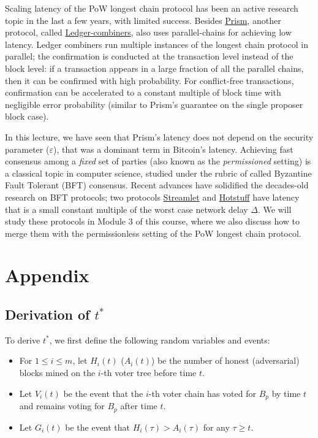 \documentclass{article}
\begin{document}
Scaling latency of the PoW longest chain protocol has been an active research topic in the last a few years,  with limited success. Besides \href{https://arxiv.org/pdf/1810.08092.pdf}{{\sf Prism}}, another protocol, called \href{https://eprint.iacr.org/2020/675.pdf}{Ledger-combiners}, also uses parallel-chains for achieving low latency. Ledger combiners run multiple instances of the longest chain protocol in parallel;  the confirmation is conducted at the transaction level instead of the block level: if a transaction appears in a large fraction of all the parallel chains, then it can be confirmed with high probability. For conflict-free transactions, confirmation can be accelerated to a constant multiple of block time with negligible error probability (similar to {\sf Prism}'s guarantee on the single proposer block case).

In this lecture, we have seen that {\sf Prism}'s latency does not depend on the security parameter ($\varepsilon$), that was a dominant term in Bitcoin's latency. Achieving fast consensus among a {\em fixed} set of parties (also known as the {\em permissioned} setting) is a classical topic in computer science, studied under the rubric of  called Byzantine Fault Tolerant (BFT) consensus. Recent advances have solidified the decades-old research on BFT protocols; two protocols \href{https://eprint.iacr.org/2020/088.pdf}{Streamlet} and \href{https://dl.acm.org/doi/pdf/10.1145/3293611.3331591}{Hotstuff}  have  latency that is a small constant multiple of the worst case network delay $\Delta$.  We will study these protocols in Module 3 of this course, where we also discuss how to merge them with the permissionless setting of the PoW longest chain protocol. 

\section*{Appendix}

\subsection*{Derivation of $t^*$}
To derive $t^*$, we first define the following random variables and events: 
\begin{itemize}
    \item For $1 \leq i \leq m$, let $H_i(t)$ ($A_i(t)$) be the number of honest (adversarial) blocks mined on the $i$-th voter tree before time $t$. 
    \item Let $V_i(t)$ be the event that the $i$-th voter chain has voted for $B_p$ by time $t$ and remains voting for $B_p$ after time $t$.
    \item Let $G_i(t)$ be the event that $H_i(\tau) > A_i(\tau)$ for any $\tau \geq t$. 
\end{itemize}
\end{document}
